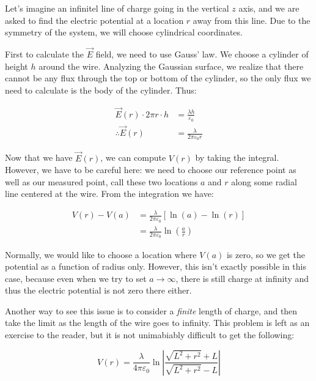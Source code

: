 \documentclass{report}
\theoremstyle{definition}
\numberwithin{equation}{section}
\numberwithin{definition}{section}
\begin{document}
    \begin{example}
        Let's imagine an infinitel line of charge going in the vertical $z$ axis, and we are asked to find the electric potential at a location $r$ away from this line. Due to the symmetry of the system, we will choose cylindrical coordinates. 

        First to calculate the $\vec{E}$ field, we need to use Gauss' law. We choose a cylinder of height $h$ around the wire. Analyzing the Gaussian surface, we realize that there cannot be any flux through the top or bottom of the cylinder, so the only flux we need to calculate is the body of the cylinder. Thus:

        \begin{align*}
            \vec E(r) \cdot 2\pi r \cdot h &= \frac{\lambda h}{\varepsilon_0}\\
            \therefore \vec{E}(r) &= \frac{\lambda}{2\pi\varepsilon_0 r}
        \end{align*}

        Now that we have $\vec{E}(r)$, we can compute $V(r)$ by taking the integral. However, we have to be careful here: we need to choose our reference point as well as our measured point, call these two locations $a$ and $r$ along some radial line centered at the wire. From the integration we have:

        \begin{align*}
            V(r) - V(a) &= \frac{\lambda}{2\pi\varepsilon_0}\left[\ln(a) - \ln(r)\right]\\
            &= \frac{\lambda}{2\pi\varepsilon_0}\ln\left(\frac{a}{r}\right)
        \end{align*}

        Normally, we would like to choose a location where $V(a)$ is zero, so we get the potential as a function of radius only. However, this isn't exactly possible in this case, because even when we try to set $a \to \infty$, there is still charge at infinity and thus the electric potential is not zero there either. 

        Another way to see this issue is to consider a \textit{finite} length of charge, and then take the limit as the length of the wire goes to infinity. This problem is left as an exercise to the reader, but it is not unimabiably difficult to get the following:

        \[ V(r) = \frac{\lambda}{4\pi\varepsilon_0}\ln\left|\frac{\sqrt{L^2 + r^2} + L}{\sqrt{L^2 + r^2} - L}\right|\]


\end{example}
\end{document}
